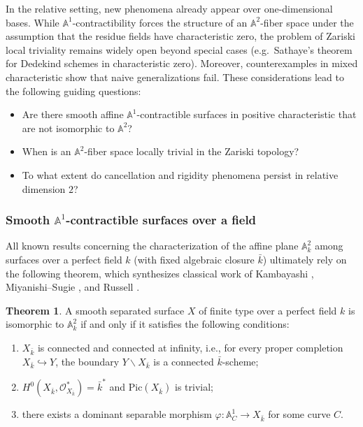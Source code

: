 \documentclass[10pt]{amsart}
\renewcommand{\AA}{\mathbb{A}}
\renewcommand{\setminus}{\smallsetminus}
\numberwithin{equation}{section} %
\theoremstyle{plain}
\theoremstyle{definition}
\newtheorem{theorem}[theorem]{Theorem}
\theoremstyle{remark}
\begin{document}
In the relative setting, new phenomena already appear over one-dimensional bases. While $\AA^1$-contractibility forces the structure of an $\AA^2$-fiber space under the assumption that the residue fields have characteristic zero, the problem of Zariski local triviality remains widely open beyond special cases (e.g.\ Sathaye’s theorem for Dedekind schemes in characteristic zero). Moreover, counterexamples in mixed characteristic show that naive generalizations fail. These considerations lead to the following guiding questions:
\begin{itemize}
\item Are there smooth affine $\AA^1$-contractible surfaces in positive characteristic that are not isomorphic to $\AA^2$?
\item When is an $\AA^2$-fiber space locally trivial in the Zariski topology?
\item To what extent do cancellation and rigidity phenomena persist in relative dimension $2$?
\end{itemize}




\subsubsection{Smooth $\AA^1$-contractible surfaces over a field}

All known results concerning the characterization of the affine plane $\mathbb{A}^2_k$ among surfaces over a perfect field $k$ (with fixed algebraic closure $\bar{k}$) ultimately rely on the following theorem, which synthesizes classical work of Kambayashi \cite{kambayashi1975absence}, Miyanishi–Sugie \cite{miyanishi1980affine}, and Russell \cite{russell1981affine}.

\begin{theorem} \label{thm:A2-charac}
A smooth separated surface $X$ of finite type over a perfect field $k$ is isomorphic to $\mathbb{A}^2_k$ if and only if it satisfies the following conditions:
\begin{enumerate}
    \item $X_{\bar{k}}$ is connected and connected at infinity, i.e., for every proper completion $X_{\bar{k}} \hookrightarrow Y$, the boundary $Y\setminus X_{\bar{k}}$ is a connected $\bar{k}$-scheme;
    \item $H^0(X_{\bar{k}},\mathcal{O}_{X_{\bar{k}}}^*)=\bar{k}^*$ and $\mathrm{Pic}(X_{\bar{k}})$ is trivial;
    \item there exists a dominant separable morphism $\varphi:\mathbb{A}^1_C\to X_{\bar{k}}$ for some curve $C$.
\end{enumerate}
\end{theorem}
\end{document}
